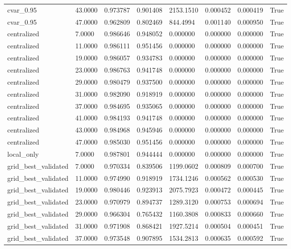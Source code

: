 \documentclass[11pt]{report}
\begin{document}
\begin{longtable}{llllllll}
cvar\_0.95 & 43.0000 & 0.973787 & 0.901408 & 2153.1510 & 0.000452 & 0.000419 & True \\
cvar\_0.95 & 47.0000 & 0.962809 & 0.802469 & 844.4994 & 0.001140 & 0.000950 & True \\
centralized & 7.0000 & 0.986646 & 0.948052 & 0.000000 & 0.000000 & 0.000000 & True \\
centralized & 11.0000 & 0.986111 & 0.951456 & 0.000000 & 0.000000 & 0.000000 & True \\
centralized & 19.0000 & 0.986057 & 0.934783 & 0.000000 & 0.000000 & 0.000000 & True \\
centralized & 23.0000 & 0.986763 & 0.941748 & 0.000000 & 0.000000 & 0.000000 & True \\
centralized & 29.0000 & 0.980479 & 0.937500 & 0.000000 & 0.000000 & 0.000000 & True \\
centralized & 31.0000 & 0.982090 & 0.918919 & 0.000000 & 0.000000 & 0.000000 & True \\
centralized & 37.0000 & 0.984695 & 0.935065 & 0.000000 & 0.000000 & 0.000000 & True \\
centralized & 41.0000 & 0.984193 & 0.941748 & 0.000000 & 0.000000 & 0.000000 & True \\
centralized & 43.0000 & 0.984968 & 0.945946 & 0.000000 & 0.000000 & 0.000000 & True \\
centralized & 47.0000 & 0.985030 & 0.951456 & 0.000000 & 0.000000 & 0.000000 & True \\
local\_only & 7.0000 & 0.987801 & 0.944444 & 0.000000 & 0.000000 & 0.000000 & True \\
grid\_best\_validated & 7.0000 & 0.970334 & 0.839506 & 1199.0602 & 0.000809 & 0.000700 & True \\
grid\_best\_validated & 11.0000 & 0.974990 & 0.918919 & 1734.1246 & 0.000562 & 0.000530 & True \\
grid\_best\_validated & 19.0000 & 0.980446 & 0.923913 & 2075.7923 & 0.000472 & 0.000445 & True \\
grid\_best\_validated & 23.0000 & 0.970979 & 0.894737 & 1289.3120 & 0.000753 & 0.000694 & True \\
grid\_best\_validated & 29.0000 & 0.966304 & 0.765432 & 1160.3808 & 0.000833 & 0.000660 & True \\
grid\_best\_validated & 31.0000 & 0.971908 & 0.868421 & 1927.5214 & 0.000504 & 0.000451 & True \\
grid\_best\_validated & 37.0000 & 0.973548 & 0.907895 & 1534.2813 & 0.000635 & 0.000592 & True \\

\end{longtable}
\end{document}
